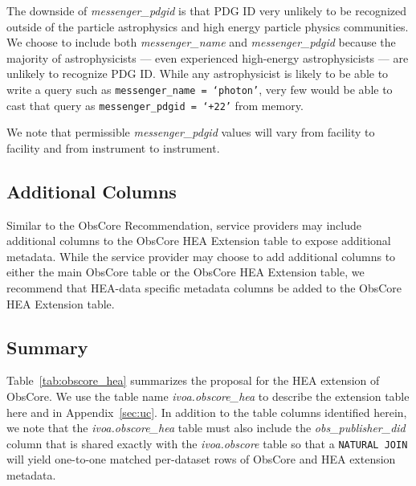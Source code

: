 \documentclass[11pt,a4paper]{ivoa}
\begin{document}
The downside of {\em messenger\_pdgid} is that PDG ID very unlikely to be recognized outside of the particle astrophysics and high energy particle physics communities.  We choose to include both {\em messenger\_name\/} and {\em messenger\_pdgid} because the majority of astrophysicists --- even experienced high-energy astrophysicists --- are unlikely to recognize PDG ID\null.  While any astrophysicist is likely to be able to write a query such as {\tt messenger\_name = `photon'}, very few would be able to cast that query as {\tt messenger\_pdgid = `+22'} from memory.

We note that permissible {\em messenger\_pdgid\/} values will vary from facility to facility and from instrument to instrument.

\subsection{Additional Columns}

Similar to the ObsCore Recommendation, service providers may include additional columns to the ObsCore \gls{HEA} Extension table to expose additional metadata.  While the service provider may choose to add additional columns to either the main ObsCore table or the ObsCore \gls{HEA} Extension table, we recommend that \gls{HEA}-data specific metadata columns be added to the ObsCore \gls{HEA} Extension table.

\subsection{Summary}

Table~\ref{tab:obscore_hea} summarizes the proposal for the \gls{HEA} extension of ObsCore.  We use the table name {\em ivoa.obscore\_hea\/} to describe the extension table here and in Appendix~\ref{sec:uc}.  In addition to the table columns identified herein, we note that the {\em ivoa.obscore\_hea\/} table must also include the {\em obs\_publisher\_did\/} column that is shared exactly with the {\em ivoa.obscore\/} table so that a {\tt NATURAL JOIN} will yield one-to-one matched per-dataset rows of ObsCore and \gls{HEA} extension metadata.
\end{document}
